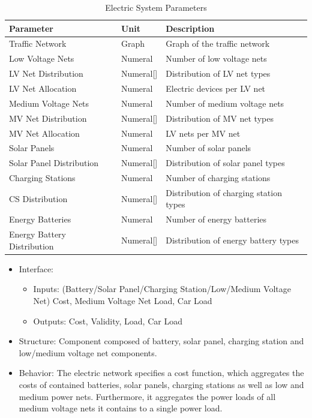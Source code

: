 \begin{table}[h]
	\renewcommand{\arraystretch}{1.3}
	\caption{Electric System Parameters}
	\centering
	\begin{tabular}{lll}
		\hline
		\textbf{Parameter}                    & \textbf{Unit} & \textbf{Description} \\ \hline
		Traffic Network                  	  & Graph          & Graph of the traffic network      \\
		Low Voltage Nets                          & Numeral    & Number of low voltage nets      \\
		LV Net Distribution                          & Numeral[]    & Distribution of LV net types      \\
		LV Net Allocation                          & Numeral    & Electric devices per LV net      \\   
		Medium Voltage Nets                        & Numeral    & Number of medium voltage nets      \\ 
		MV Net Distribution                          & Numeral[]    & Distribution of MV net types      \\
		MV Net Allocation                          & Numeral    & LV nets per MV net      \\   
		Solar Panels                       & Numeral    & Number of solar panels      \\ 
		Solar Panel Distribution                          & Numeral[]    & Distribution of solar panel types      \\  
		Charging Stations                          & Numeral    & Number of charging stations      \\
		CS Distribution                          & Numeral[]    & Distribution of charging station types      \\   
		Energy Batteries                        & Numeral    & Number of energy batteries      \\
		Energy Battery Distribution                          & Numeral[]    & Distribution of energy battery types      \\  \hline 
	\end{tabular}
\end{table}

\begin{itemize}
	\item Interface: 
	\begin{itemize}
		\item Inputs: (Battery/Solar Panel/Charging Station/Low/Medium Voltage Net) Cost, Medium Voltage Net Load, Car Load
		\item Outputs: Cost, Validity, Load, Car Load
	\end{itemize}	
	\item Structure: Component composed of battery, solar panel, charging station and low/medium voltage net components.
	\item Behavior: The electric network specifies a cost function, which aggregates the costs of contained batteries, solar panels, charging stations as well as low and medium power nets. 
	Furthermore, it aggregates the power loads of all medium voltage nets it contains to a single power load.
\end{itemize}

